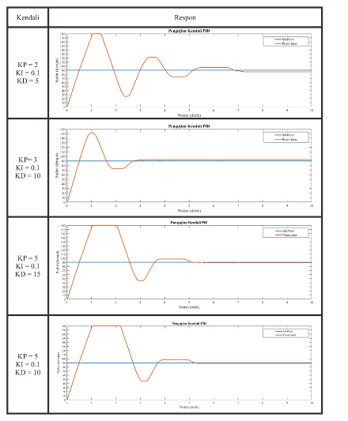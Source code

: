 \begin{figure}[H]
	\centering
	\includegraphics[width=\textwidth,height=\textheight,keepaspectratio]{gambar/kendali1.png}
\end{figure}

